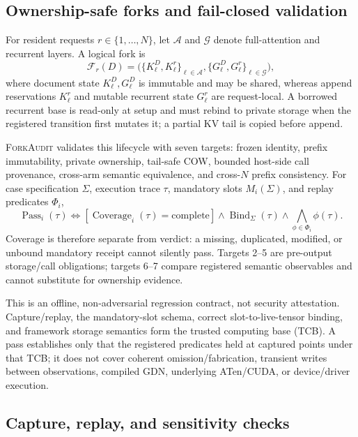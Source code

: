 \documentclass{article}
\newcommand{\method}{\textsc{ForkAudit}}
\begin{document}
\subsection{Ownership-safe forks and fail-closed validation}

For resident requests \(r\in\{1,\ldots,N\}\), let \(\mathcal A\) and
\(\mathcal G\) denote full-attention and recurrent layers.  A logical fork is
\begin{equation}
  \mathcal{F}_r(D)=
  \bigl(\{K^D_\ell,K^r_\ell\}_{\ell\in\mathcal A},
        \{G^D_\ell,G^r_\ell\}_{\ell\in\mathcal G}\bigr),
\end{equation}
where document state \(K^D_\ell,G^D_\ell\) is immutable and may be shared,
whereas append reservations \(K^r_\ell\) and mutable recurrent state
\(G^r_\ell\) are request-local.  A borrowed recurrent base is read-only at
setup and must rebind to private storage when the registered transition first
mutates it; a partial KV tail is copied before append.

\method{} validates this lifecycle with seven targets: frozen identity, prefix
immutability, private ownership, tail-safe COW, bounded host-side call
provenance, cross-arm semantic equivalence, and cross-\(N\) prefix consistency.
For case specification \(\Sigma\), execution trace \(\tau\), mandatory slots
\(M_i(\Sigma)\), and replay predicates \(\Phi_i\),
\begin{equation}
  \operatorname{Pass}_i(\tau)\Longleftrightarrow
  [\operatorname{Coverage}_i(\tau)=\mathrm{complete}]
  \wedge\operatorname{Bind}_{\Sigma}(\tau)
  \wedge\bigwedge_{\phi\in\Phi_i}\phi(\tau).
\end{equation}
Coverage is therefore separate from verdict: a missing, duplicated, modified,
or unbound mandatory receipt cannot silently pass.  Targets 2--5 are
pre-output storage/call obligations; targets 6--7 compare registered semantic
observables and cannot substitute for ownership evidence.

This is an offline, non-adversarial regression contract, not security
attestation.  Capture/replay, the mandatory-slot schema, correct
slot-to-live-tensor binding, and framework storage semantics form the trusted
computing base (TCB).  A pass establishes only that the registered predicates
held at captured points under that TCB; it does not cover coherent
omission/fabrication, transient writes between observations, compiled GDN,
underlying ATen/CUDA, or device/driver execution.

\subsection{Capture, replay, and sensitivity checks}
\end{document}
